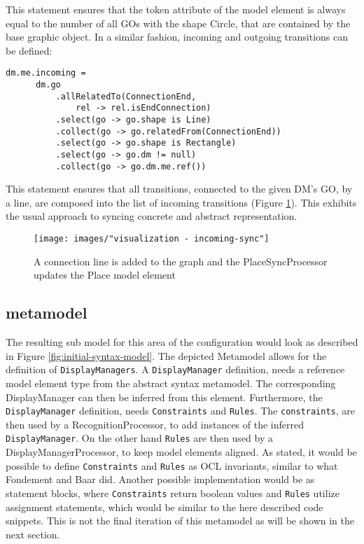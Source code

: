 This statement ensures that the token attribute of the model element is always equal to the number of all GOs with the shape Circle, that are contained by the base graphic object. In a similar fashion, incoming and outgoing transitions can be defined:
\begin{lstlisting}[captionpos=b,caption={Rule that syncs incoming transitions of a place element},label={lst:incoming-transitions}]
dm.me.incoming = 
      dm.go
          .allRelatedTo(ConnectionEnd,
              rel -> rel.isEndConnection)
          .select(go -> go.shape is Line)
          .collect(go -> go.relatedFrom(ConnectionEnd))
          .select(go -> go.shape is Rectangle)
          .select(go -> go.dm != null)
          .collect(go -> go.dm.me.ref())
\end{lstlisting}

This statement ensures that all transitions, connected to the given DM's GO, by a line, are composed into the list of incoming transitions (Figure \ref{fig:incoming-sync}). This exhibits the usual approach to syncing concrete and abstract representation. 


\begin{figure}
  \centering
  \texttt{[image: images/"visualization - incoming-sync"]}
  \caption{A connection line is added to the graph and the PlaceSyncProcessor updates the Place model element}
  \label{fig:incoming-sync}
\end{figure}

\subsection{metamodel}
The resulting sub model for this area of the configuration would look as described in Figure \ref{fig:initial-syntax-model}. The depicted Metamodel allows for the definition of \texttt{DisplayManagers}. A \texttt{DisplayManager} definition, needs a reference model element type from the abstract syntax metamodel. The corresponding DisplayManager can then be inferred from this element. Furthermore, the \texttt{DisplayManager} definition, needs \texttt{Constraints} and \texttt{Rules}. The \texttt{constraints}, are then used by a RecognitionProcessor, to add instances of the inferred \texttt{DisplayManager}. On the other hand \texttt{Rules} are then used by a DisplayManagerProcessor, to keep model elements aligned. As stated, it would be possible to define \texttt{Constraints} and \texttt{Rules} as OCL invariants, similar to what Fondement and Baar did. Another possible implementation would be as statement blocks, where \texttt{Constraints} return boolean values and \texttt{Rules} utilize assignment statements, which would be similar to the here described code snippets. This is not the final iteration of this metamodel as will be shown in the next section.


